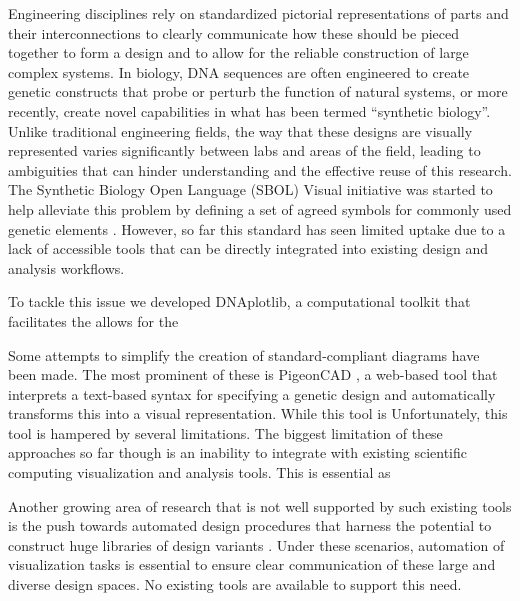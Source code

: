 \documentclass{bioinfo}
\begin{document}
Engineering disciplines rely on standardized pictorial representations of parts and their interconnections to clearly communicate how these should be pieced together to form a design and to allow for the reliable construction of large complex systems. In biology, DNA sequences are often engineered to create genetic constructs that probe or perturb the function of natural systems, or more recently, create novel capabilities in what has been termed ``synthetic biology''. Unlike traditional engineering fields, the way that these designs are visually represented varies significantly between labs and areas of the field, leading to ambiguities that can hinder understanding and the effective reuse of this research. The Synthetic Biology Open Language (SBOL) Visual initiative was started to help alleviate this problem by defining a set of agreed symbols for commonly used genetic elements \citep{Quinn13a}. However, so far this standard has seen limited uptake due to a lack of accessible tools that can be directly integrated into existing design and analysis workflows.

To tackle this issue we developed DNAplotlib, a computational toolkit that facilitates the allows for the 

Some attempts to simplify the creation of standard-compliant diagrams have been made. The most prominent of these is PigeonCAD \citep{Bhatia13a}, a web-based tool that interprets a text-based syntax for specifying a genetic design and automatically transforms this into a visual representation. While this tool is Unfortunately, this tool is hampered by several limitations. The biggest limitation of these approaches so far though is an inability to integrate with existing scientific computing visualization and analysis tools. This is essential as 

Another growing area of research that is not well supported by such existing tools is the push towards automated design procedures that harness the potential to construct huge libraries of design variants \citep{Smanski14a,Bilitchenko11a}. Under these scenarios, automation of visualization tasks is essential to ensure clear communication of these large and diverse design spaces. No existing tools are available to support this need. 
\end{document}

